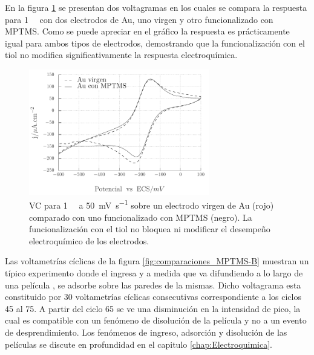			 En la figura \ref{fig:comparaciones_MPTMS-A} se presentan dos voltagramas en los cuales se compara la respuesta para \aminorutenio\space \SI{1}{\milli\Molar} con dos electrodos de Au, uno virgen y otro funcionalizado con MPTMS. Como se puede apreciar en el gráfico la respuesta es prácticamente igual para ambos tipos de electrodos, demostrando que la funcionalización con el tiol no modifica significativamente la respuesta electroquímica.

					\begin{figure}[!ht]
							\begin{center}
							\includegraphics[width=0.70\textwidth]{Graficos/Comparacion_Au-MPTMS.pdf}
							\caption[Comparación de electrodos con y sin MPTMS]{VC para \aminorutenio\space \SI{1}{\milli\Molar} a \SI{50}{\milli\volt\per\second} sobre un electrodo virgen de Au (rojo) comparado con uno funcionalizado con MPTMS (negro). La funcionalización con el tiol no bloquea ni modificar el desempeño electroquímico de los electrodos.}
							\label{fig:comparaciones_MPTMS-A}
							\end{center}
							\end{figure}

             Las voltametrías cíclicas de la figura \ref{fig:comparaciones_MPTMS-B} muestran un típico experimento donde el \aminorutenio\space ingresa y a medida que va difundiendo a lo largo de una película \pdmF, se adsorbe sobre las paredes de la mismas. Dicho voltagrama esta constituido por 30 voltametrías cíclicas consecutivas correspondiente a los ciclos 45 al 75. A partir del ciclo 65 se ve una disminución en la intensidad de pico, la cual es compatible con un fenómeno de disolución de la película y no a un evento de desprendimiento. Los fenómenos de ingreso, adsorción y disolución de las películas se discute en profundidad en el capitulo \ref{chap:Electroquimica}.
       	
